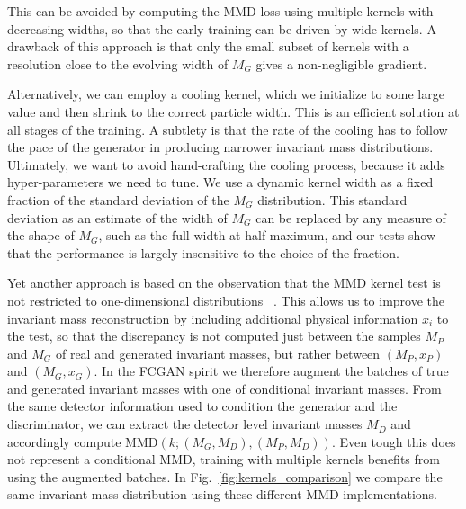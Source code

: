 \begin{appendices}
This can be avoided by computing the MMD loss using multiple kernels
with decreasing widths, so that the early training can be driven by
wide kernels.  A drawback of this approach is that only the small
subset of kernels with a resolution close to the evolving width of
$M_G$ gives a non-negligible gradient.

Alternatively, we can employ a cooling kernel, which we initialize to
some large value and then shrink to the correct particle width. This
is an efficient solution at all stages of the training.  A subtlety is
that the rate of the cooling has to follow the pace of the
generator in producing narrower invariant mass
distributions. Ultimately, we want to avoid hand-crafting the cooling
process, because it adds hyper-parameters we need to tune.  We use a
dynamic kernel width as a fixed fraction of the standard deviation of
the $M_G$ distribution.  This standard deviation as an estimate of the
width of $M_{G}$ can be replaced by any measure of the shape of
$M_{G}$, such as the full width at half maximum, and our tests show
that the performance is largely insensitive to the choice of the
fraction.

Yet another approach is based on the observation that the MMD kernel
test is not restricted to one-dimensional distributions
~\cite{GMMN,MomentMatching, MMDgen}.
This allows us to improve the invariant mass reconstruction by including
 additional physical information $x_i$ to the test, so that the
 discrepancy is not computed just between the samples $M_P$ and $M_G$
 of real and generated invariant masses, but rather between
 $(M_P, x_P)$ and $(M_G, x_G)$.
In the FCGAN spirit we therefore augment the batches of true and
generated invariant masses with one of
conditional invariant masses. From the same detector
information used to condition the generator and the discriminator, we
can extract the detector level invariant masses $M_D$ and accordingly
compute $\text{MMD}(k; (M_G, M_D), (M_P, M_D))$. Even tough
this does not represent a conditional MMD, training with multiple
kernels benefits from using the augmented batches. In
Fig.~\ref{fig:kernels_comparison} we compare the same invariant mass
distribution using these different MMD implementations.


\end{appendices}

